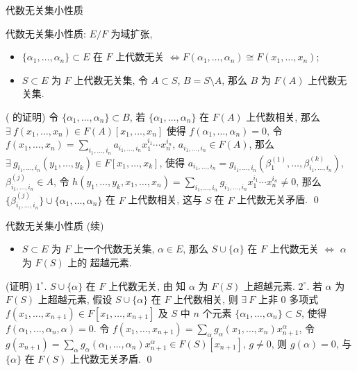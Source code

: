 
\begin{frame}{代数无关集小性质}

代数无关集小性质: $E/F$ 为域扩张,
\begin{itemize}
\item {} $\{ \alpha_1, \dots, \alpha_n \} \subset E$ 在 $F$ 上代数无关
  $\iff F(\alpha_1, \dots, \alpha_n) \cong F(x_1, \dots, x_n)$;
\item {} $S \subset E$ 为 $F$ 上代数无关集, 令 $A \subset S$,
  $B = S \setminus A$, 那么 $B$ 为 $F(A)$ 上代数无关集.
\end{itemize}

\startproof[bg=yellow, fg=red]( 的证明)
令 $\{ \alpha_1, \dots, \alpha_n \} \subset B$, 若 $\{ \alpha_1, \dots, \alpha_n \}$
在 $F(A)$ 上代数相关,
那么 $\exists\ f(x_1, \dots, x_n) \in F(A)[x_1, \dots, x_n]$
使得 $f(\alpha_1, \dots, \alpha_n) = 0$,
令 $f(x_1, \dots, x_n) = \sum_{i_1, \dots, i_n} a_{i_1, \dots, i_n}
x_1^{i_1} \dotsm x_n^{i_n}$, $a_{i_1, \dots, i_n} \in F(A)$,
那么 $\exists\ g_{i_1, \dots, i_n}(y_1, \dots, y_k) \in F[x_1, \dots, x_k]$,
使得 $a_{i_1, \dots, i_n} = g_{i_1, \dots, i_n}(\beta_1^{(1)}, \dots,
\beta_{i_1, \dots, i_n}^{(k)})$, $\beta_{i_1, \dots, i_n}^{(j)} \in A$,
令 $h(y_1, \dots, y_k, x_1, \dots, x_n) = \sum_{i_1, \dots, i_n}
g_{i_1, \dots, i_n} x_1^{i_1} \dotsm x_n^{i_n} \neq 0$,
那么 $\{ \beta_{i_1, \dots, i_n}^{(j)} \} \cup \{ \alpha_1, \dots, \alpha_n \}$
在 $F$ 上代数相关,
这与 $S$ 在 $F$ 上代数无关矛盾.
\qed

\end{frame}


\begin{frame}{代数无关集小性质 (续)}

\begin{itemize}
\item {} $S \subset E$ 为 $F$ 上一个代数无关集, $\alpha \in E$, 那么
  $S \cup \{ \alpha \}$ 在 $F$ 上代数无关 $\iff$ $\alpha$ 为 $F(S)$ 上的
  超越元素.
\end{itemize}

\startproof[bg=yellow, fg=red](证明)
$1^{\circ}$. $S \cup \{ \alpha \}$ 在 $F$ 上代数无关,
由  知 $\alpha$ 为 $F(S)$ 上超越元素.
$2^{\circ}$. 若 $\alpha$ 为 $F(S)$ 上超越元素,
假设 $S \cup \{ \alpha \}$ 在 $F$ 上代数相关, 则 $\exists\ F$ 上非 0 多项式
$f(x_1, \dots, x_{n+1}) \in F[x_1, \dots, x_{n+1}]$
及 $S$ 中 $n$ 个元素 $\{ \alpha_1, \dots, \alpha_n \} \subset S$,
使得 $f(\alpha_1, \dots, \alpha_n, \alpha) = 0$.
令 $f(x_1, \dots, x_{n+1}) = \sum_{\alpha} g_{\alpha}(x_1, \dots, x_n)
x_{n+1}^{\alpha}$,
令 $g(x_{n+1}) = \sum_{\alpha} g_{\alpha}(\alpha_1, \dots, \alpha_n)
x_{n+1}^{\alpha} \in F(S)[x_{n+1}]$,
$g \neq 0$, 则 $g(\alpha) = 0$, 与 $\{ \alpha \}$ 在 $F(S)$ 上代数无关矛盾.
\qed

\end{frame}

